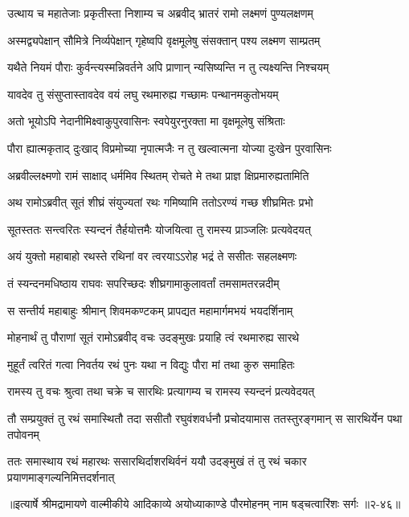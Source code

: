 \twolineshloka
{उत्थाय च महातेजाः प्रकृतीस्ता निशाम्य च}
{अब्रवीद् भ्रातरं रामो लक्ष्मणं पुण्यलक्षणम्} %

\twolineshloka
{अस्मद्व्यपेक्षान् सौमित्रे निर्व्यपेक्षान् गृहेष्वपि}
{वृक्षमूलेषु संसक्तान् पश्य लक्ष्मण साम्प्रतम्} %

\twolineshloka
{यथैते नियमं पौराः कुर्वन्त्यस्मन्निवर्तने}
{अपि प्राणान् न्यसिष्यन्ति न तु त्यक्ष्यन्ति निश्चयम्} %

\twolineshloka
{यावदेव तु संसुप्तास्तावदेव वयं लघु}
{रथमारुह्य गच्छामः पन्थानमकुतोभयम्} %

\twolineshloka
{अतो भूयोऽपि नेदानीमिक्ष्वाकुपुरवासिनः}
{स्वपेयुरनुरक्ता मा वृक्षमूलेषु संश्रिताः} %

\twolineshloka
{पौरा ह्यात्मकृताद् दुःखाद् विप्रमोच्या नृपात्मजैः}
{न तु खल्वात्मना योज्या दुःखेन पुरवासिनः} %

\twolineshloka
{अब्रवील्लक्ष्मणो रामं साक्षाद् धर्ममिव स्थितम्}
{रोचते मे तथा प्राज्ञ क्षिप्रमारुह्यतामिति} %

\twolineshloka
{अथ रामोऽब्रवीत् सूतं शीघ्रं संयुज्यतां रथः}
{गमिष्यामि ततोऽरण्यं गच्छ शीघ्रमितः प्रभो} %

\twolineshloka
{सूतस्ततः सन्त्वरितः स्यन्दनं तैर्हयोत्तमैः}
{योजयित्वा तु रामस्य प्राञ्जलिः प्रत्यवेदयत्} %

\twolineshloka
{अयं युक्तो महाबाहो रथस्ते रथिनां वर}
{त्वरयाऽऽरोह भद्रं ते ससीतः सहलक्ष्मणः} %

\twolineshloka
{तं स्यन्दनमधिष्ठाय राघवः सपरिच्छदः}
{शीघ्रगामाकुलावर्तां तमसामतरन्नदीम्} %

\twolineshloka
{स सन्तीर्य महाबाहुः श्रीमान् शिवमकण्टकम्}
{प्रापद्यत महामार्गमभयं भयदर्शिनाम्} %

\twolineshloka
{मोहनार्थं तु पौराणां सूतं रामोऽब्रवीद् वचः}
{उदङ्मुखः प्रयाहि त्वं रथमारुह्य सारथे} %

\twolineshloka
{मुहूर्तं त्वरितं गत्वा निवर्तय रथं पुनः}
{यथा न विद्युः पौरा मां तथा कुरु समाहितः} %

\twolineshloka
{रामस्य तु वचः श्रुत्वा तथा चक्रे च सारथिः}
{प्रत्यागम्य च रामस्य स्यन्दनं प्रत्यवेदयत्} %

\twolineshloka
{तौ सम्प्रयुक्तं तु रथं समास्थितौ तदा ससीतौ रघुवंशवर्धनौ}
{प्रचोदयामास ततस्तुरङ्गमान् स सारथिर्येन पथा तपोवनम्} %

\twolineshloka
{ततः समास्थाय रथं महारथः ससारथिर्दाशरथिर्वनं ययौ}
{उदङ्मुखं तं तु रथं चकार प्रयाणमाङ्गल्यनिमित्तदर्शनात्} %


॥इत्यार्षे श्रीमद्रामायणे वाल्मीकीये आदिकाव्ये अयोध्याकाण्डे पौरमोहनम् नाम षड्चत्वारिंशः सर्गः ॥२-४६॥
